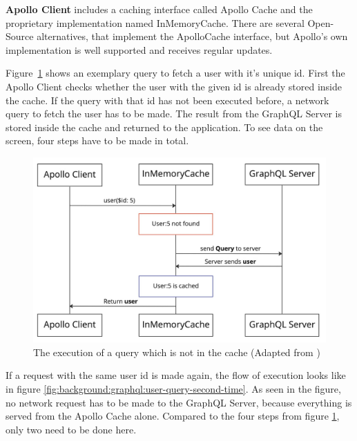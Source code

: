\bigskip

\noindent \textbf{Apollo Client} includes a caching interface called Apollo Cache and the proprietary implementation named InMemoryCache. There are several Open-Source alternatives, that implement the ApolloCache interface, but Apollo's own implementation is well supported and receives regular updates.

\bigskip

\noindent Figure~\ref{fig:background:graphql:user-query-first-time} shows an exemplary query to fetch a user with it's unique id. First the Apollo Client checks whether the user with the given id is already stored inside the cache. If the query with that id has not been executed before, a network query to fetch the user has to be made. The result from the GraphQL Server is stored inside the cache and returned to the application. To see data on the screen, four steps have to be made in total. \cite{misc:-:background:graphql:apollo-client-cache-overview}

\ifshowImages
\begin{figure}[H]
    \centering
    \includegraphics[width=0.6\linewidth]{images/background/apollo/apollo-client-basic-cache.jpeg}
    \caption{The execution of a query which is not in the cache (Adapted from \cite{misc:-:background:graphql:apollo-client-cache-overview})}\label{fig:background:graphql:user-query-first-time}
\end{figure}
\fi

\noindent If a request with the same user id is made again, the flow of execution looks like in figure \ref{fig:background:graphql:user-query-second-time}. As seen in the figure, no network request has to be made to the GraphQL Server, because everything is served from the Apollo Cache alone. Compared to the four steps from figure \ref{fig:background:graphql:user-query-first-time}, only two need to be done here. \cite{misc:-:background:graphql:apollo-client-cache-overview}

